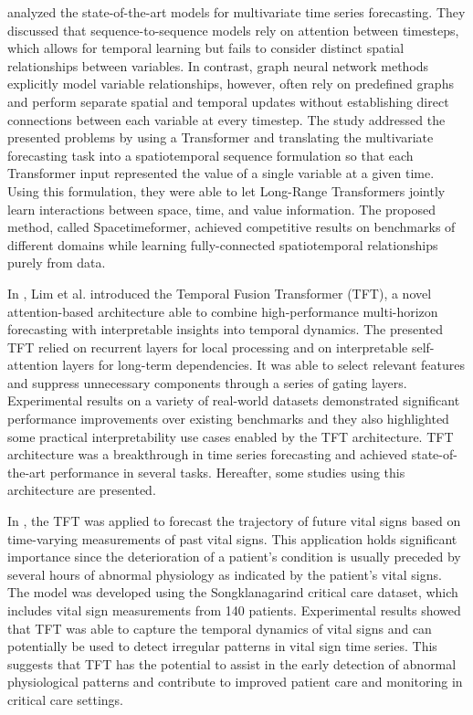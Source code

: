 \cite{Grigsby2021} analyzed the state-of-the-art models for multivariate time series forecasting.
They discussed that sequence-to-sequence models rely on attention between timesteps, which allows for temporal learning but fails to consider distinct spatial relationships between variables.
In contrast, graph neural network methods explicitly model variable relationships, however, often rely on predefined graphs and perform separate spatial and temporal updates without establishing direct connections between each variable at every timestep.
The study addressed the presented problems by using a Transformer and translating the multivariate forecasting task into a spatiotemporal sequence formulation so that each Transformer input represented the value of a single variable at a given time.
Using this formulation, they were able to let Long-Range Transformers jointly learn interactions between space, time, and value information.
The proposed method, called Spacetimeformer, achieved competitive results on benchmarks of different domains while learning fully-connected spatiotemporal relationships purely from data.

In \cite{LIM20211748}, Lim et al. introduced the Temporal Fusion Transformer (TFT), a novel attention-based architecture able to combine high-performance multi-horizon forecasting with interpretable insights into temporal dynamics.
The presented TFT relied on recurrent layers for local processing and on interpretable self-attention layers for long-term dependencies.
It was able to select relevant features and suppress unnecessary components through a series of gating layers.
Experimental results on a variety of real-world datasets demonstrated significant performance improvements over existing benchmarks and they also highlighted some practical interpretability use cases enabled by the TFT architecture.
TFT architecture was a breakthrough in time series forecasting and achieved state-of-the-art performance in several tasks.
Hereafter, some studies using this architecture are presented.

In \cite{9745215}, the TFT was applied to forecast the trajectory of future vital signs based on time-varying measurements of past vital signs.
This application holds significant importance since the deterioration of a patient’s condition is usually preceded by several hours of abnormal physiology as indicated by the patient’s vital signs.
The model was developed using the Songklanagarind critical care dataset, which includes vital sign measurements from 140 patients.
Experimental results showed that TFT was able to capture the temporal dynamics of vital signs and can potentially be used to detect irregular patterns in vital sign time series.
This suggests that TFT has the potential to assist in the early detection of abnormal physiological patterns and contribute to improved patient care and monitoring in critical care settings.

